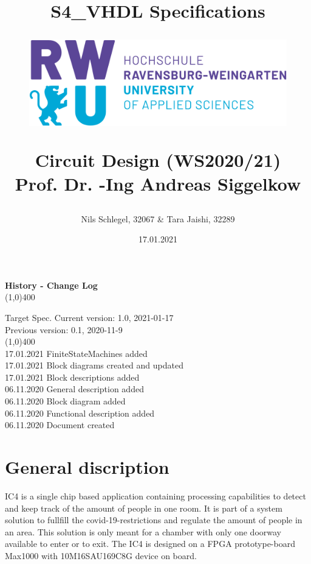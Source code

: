 \documentclass[12pt,a4 paper] {report}
\title{
	\textbf{S4\_VHDL Specifications} \\
	\begin{figure}[h]
		\centering
		\includegraphics[scale=0.4]{../png/rwu.png}
	\end{figure}
	Circuit Design (WS2020/21) \\
	Prof. Dr. -Ing Andreas Siggelkow \\
}
\author{Nils Schlegel, 32067 \& Tara Jaishi, 32289}
\date{17.01.2021}
\begin{document}
\maketitle

\newpage

\textbf{History - Change Log} \\
\line(1,0){400}
\begin{flushleft}
	Target Spec. Current version: 1.0, 2021-01-17 \\
\hspace{2.2cm}	Previous version: 0.1, 2020-11-9 \\
\line(1,0){400} \\
\hspace{2.2cm}	17.01.2021 \hfill FiniteStateMachines added \\
\hspace{2.2cm}	17.01.2021 \hfill Block diagrams created and updated \\
\hspace{2.2cm}	17.01.2021 \hfill Block descriptions added \\
\hspace{2.2cm}	06.11.2020 \hfill General description added \\
\hspace{2.2cm}	06.11.2020 \hfill Block diagram added \\
\hspace{2.2cm}	06.11.2020 \hfill Functional description added \\
\hspace{2.2cm}	06.11.2020 \hfill Document created
\end{flushleft}

\newpage

\tableofcontents

\newpage

\chapter{General discription}
IC4 is a single chip based application containing processing capabilities to detect and keep track of the amount of people in one room. It is part of a system solution to fullfill the covid-19-restrictions and regulate the amount of people in an area. This solution is only meant for a chamber with only one doorway available to enter or to exit.\newline
The IC4 is designed on a FPGA prototype-board Max1000 with 10M16SAU169C8G device on board.
\newpage	
\end{document}
